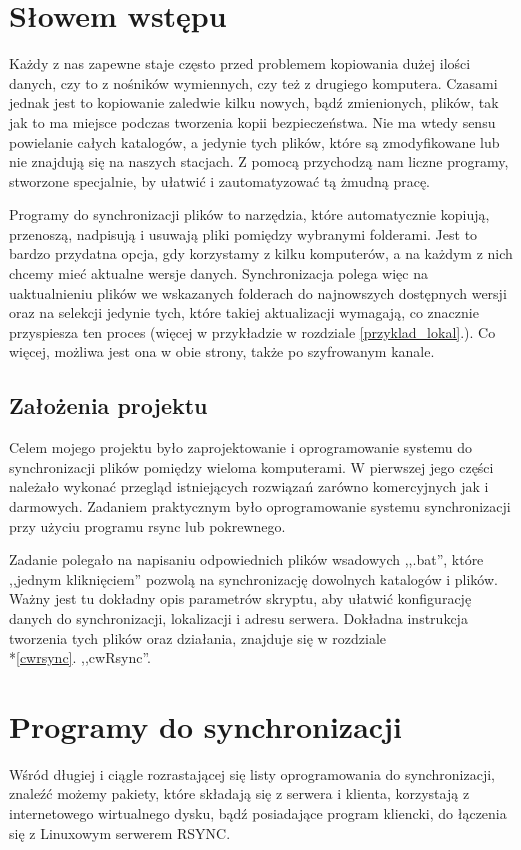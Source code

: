 \section{Słowem wstępu}
Każdy z nas zapewne staje często przed problemem kopiowania dużej ilości danych, czy to z nośników wymiennych, czy też z drugiego komputera. Czasami jednak jest to kopiowanie zaledwie kilku nowych, bądź zmienionych, plików, tak jak to ma miejsce podczas tworzenia kopii bezpieczeństwa. Nie ma wtedy sensu powielanie całych katalogów, a jedynie tych plików, które są zmodyfikowane lub nie znajdują się na naszych stacjach. Z pomocą przychodzą nam liczne programy, stworzone specjalnie, by ułatwić i zautomatyzować tą żmudną pracę. 

Programy do synchronizacji plików to narzędzia, które automatycznie kopiują, przenoszą, nadpisują i usuwają pliki pomiędzy wybranymi folderami. Jest to bardzo przydatna opcja, gdy korzystamy z kilku komputerów, a na każdym z nich chcemy mieć aktualne wersje danych. Synchronizacja polega więc na uaktualnieniu plików we wskazanych folderach do najnowszych dostępnych wersji oraz na selekcji jedynie tych, które takiej aktualizacji wymagają, co znacznie przyspiesza ten proces (więcej w przykładzie w rozdziale \ref{przyklad_lokal}.). Co więcej, możliwa jest ona w obie strony, także po szyfrowanym kanale.

\subsection{Założenia projektu}
Celem mojego projektu było zaprojektowanie i oprogramowanie systemu do synchronizacji plików pomiędzy wieloma komputerami. W pierwszej jego części należało wykonać przegląd istniejących rozwiązań zarówno komercyjnych jak i darmowych. Zadaniem praktycznym było oprogramowanie systemu synchronizacji przy użyciu programu rsync lub pokrewnego.

Zadanie polegało na napisaniu odpowiednich plików wsadowych ,,.bat'', które ,,jednym kliknięciem''  pozwolą na synchronizację dowolnych katalogów i plików. Ważny jest tu dokładny opis parametrów skryptu, aby ułatwić konfigurację danych do synchronizacji, lokalizacji i adresu serwera. Dokładna instrukcja tworzenia tych plików oraz działania, znajduje się w rozdziale \\*\ref{cwrsync}. ,,cwRsync''.

\section{Programy do synchronizacji}
\label{dosynch}
Wśród długiej i ciągle rozrastającej się listy oprogramowania do synchronizacji, znaleźć możemy pakiety, które składają się z serwera i klienta, korzystają z internetowego wirtualnego dysku, bądź posiadające program kliencki, do łączenia się z Linuxowym serwerem RSYNC.

